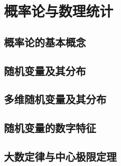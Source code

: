 \part{概率论与数理统计}

\chapter{概率论的基本概念}%





\chapter{随机变量及其分布}%




%
%
%

\chapter{多维随机变量及其分布}%




%
%

\chapter{随机变量的数字特征}%



%
%

\chapter{大数定律与中心极限定理}%






